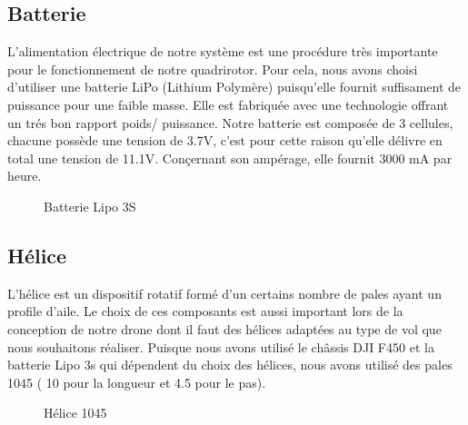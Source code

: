 	\subsection{Batterie}
	L'alimentation électrique de notre système est une procédure très importante pour le fonctionnement de notre quadrirotor. Pour cela, nous avons choisi d'utiliser une batterie LiPo (Lithium Polymère) puisqu'elle fournit suffisament de puissance pour une faible masse. Elle est fabriquée avec une technologie offrant un trés bon rapport poids/ puissance. Notre batterie est composée de 3 cellules, chacune possède une tension de 3.7V, c'est pour cette raison qu'elle délivre en total une tension de 11.1V. Conçernant son ampérage, elle fournit 3000 mA par heure.
	\par
	\begin{figure} [h]
		\begin{center}
			\centering
		\end{center}
		\caption{Batterie Lipo 3S}
	\end{figure}
	\subsection{Hélice}
	L’hélice est un dispositif rotatif formé d’un certains nombre de pales ayant un profile d’aile. Le choix de ces composants est aussi important lors de la conception de notre drone dont il faut des hélices adaptées au type de vol que nous souhaitons réaliser. Puisque nous avons utilisé le châssis DJI F450 et la batterie Lipo 3s qui dépendent du choix des hélices, nous avons utilisé des pales 1045 ( 10 pour la longueur et 4.5 pour le pas).
	\begin{figure} [h]
		\begin{center}
			\centering
		\end{center}
		\caption{Hélice 1045}
	\end{figure}
